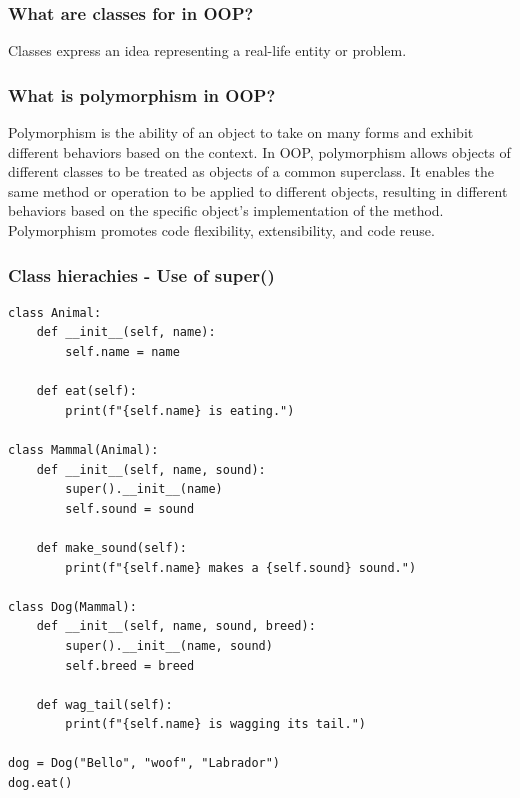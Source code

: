 \newpage
\subsubsection{What are classes for in OOP?}

Classes express an idea representing a real-life entity or problem.

\subsubsection{What is polymorphism in OOP?}

Polymorphism is the ability of an object to take on many forms and exhibit different behaviors based on the context. In OOP, polymorphism allows objects of different classes to be treated as objects of a common superclass. It enables the same method or operation to be applied to different objects, resulting in different behaviors based on the specific object's implementation of the method. Polymorphism promotes code flexibility, extensibility, and code reuse.

\subsubsection{Class hierachies - Use of super()}

\begin{codebox}
\begin{verbatim}
class Animal:
    def __init__(self, name):
        self.name = name
    
    def eat(self):
        print(f"{self.name} is eating.")
 
class Mammal(Animal):
    def __init__(self, name, sound):
        super().__init__(name)
        self.sound = sound
    
    def make_sound(self):
        print(f"{self.name} makes a {self.sound} sound.")
 
class Dog(Mammal):
    def __init__(self, name, sound, breed):
        super().__init__(name, sound)
        self.breed = breed
    
    def wag_tail(self):
        print(f"{self.name} is wagging its tail.")

dog = Dog("Bello", "woof", "Labrador")
dog.eat()
\end{verbatim}
\end{codebox}

